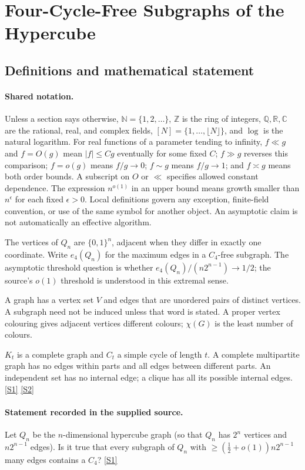 \documentclass[11pt,a4paper]{article}
\newcommand{\N}{\mathbb{N}}
\newcommand{\Z}{\mathbb{Z}}
\newcommand{\Q}{\mathbb{Q}}
\newcommand{\R}{\mathbb{R}}
\newcommand{\C}{\mathbb{C}}
\newcommand{\sref}[2]{\hyperlink{source:#1:#2}{[S#2]}}
\begin{document}
\section{Four-Cycle-Free Subgraphs of the Hypercube}\label{statement}


\subsection{Definitions and mathematical statement}

\paragraph{Shared notation.}Unless a section says otherwise, $\N=\{1,2,\ldots\}$,
$\Z$ is the ring of integers, $\Q,\R,\C$ are the rational, real, and complex
fields, $[N]=\{1,\ldots,\lfloor N\rfloor\}$, and $\log$ is the natural
logarithm. For real functions of a parameter tending to infinity,
$f\ll g$ and $f=O(g)$ mean $|f|\leq Cg$ eventually for some fixed $C$;
$f\gg g$ reverses this comparison; $f=o(g)$ means $f/g\to0$;
$f\sim g$ means $f/g\to1$; and $f\asymp g$ means both order bounds.
A subscript on $O$ or $\ll$ specifies allowed constant dependence.
The expression $n^{o(1)}$ in an upper bound means growth smaller than
$n^\epsilon$ for each fixed $\epsilon>0$. Local definitions govern any
exception, finite-field convention, or use of the same symbol for another
object. An asymptotic claim is not automatically an effective algorithm.



The vertices of $Q_n$ are $\{0,1\}^n$, adjacent when they differ in exactly one coordinate. Write $e_4(Q_n)$ for the maximum edges in a $C_4$-free subgraph. The asymptotic threshold question is whether $e_4(Q_n)/(n2^{n-1})\to1/2$; the source's $o(1)$ threshold is understood in this extremal sense.

A graph has a vertex set $V$ and edges that are unordered pairs of distinct vertices. A subgraph need not be induced unless that word is stated. A proper vertex colouring gives adjacent vertices different colours; $\chi(G)$ is the least number of colours.

$K_t$ is a complete graph and $C_t$ a simple cycle of length $t$. A complete multipartite graph has no edges within parts and all edges between different parts. An independent set has no internal edge; a clique has all its possible internal edges. \sref{statement}{1} \sref{statement}{2}

\paragraph{Statement recorded in the supplied source.}
Let $Q_n$ be the $n$-dimensional hypercube graph (so that $Q_n$ has $2^n$ vertices and $n2^{n-1}$ edges). Is it true that every subgraph of $Q_n$ with $ \geq \left(\frac{1}{2}+o(1)\right)n2^{n-1} $ many edges contains a $C_4$? \sref{statement}{1}
\end{document}
